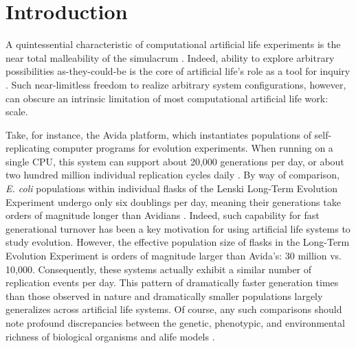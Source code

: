 \section{Introduction}

A quintessential characteristic of computational artificial life experiments is the near total malleability of the simulacrum \citep{pattee1989simulations}.
Indeed, ability to explore arbitrary possibilities as-they-could-be is the core of artificial life's role as a tool for inquiry \citep{langton1997artificial}.
Such near-limitless freedom to realize arbitrary system configurations, however, can obscure an intrinsic limitation of most computational artificial life work: scale.

Take, for instance, the Avida platform, which instantiates populations of self-replicating computer programs for evolution experiments.
When running on a single CPU, this system can support about 20,000 generations per day, or about two hundred million individual replication cycles daily \citep{ofria2009artificial}.
By way of comparison, \textit{E. coli} populations within individual flasks of the Lenski Long-Term Evolution Experiment undergo only six doublings per day, meaning their generations take orders of magnitude longer than Avidians \citep{good2017dynamics}.
Indeed, such capability for fast generational turnover has been a key motivation for using artificial life systems to study evolution.
However, the effective population size of flasks in the Long-Term Evolution Experiment is orders of magnitude larger than Avida's: 30 million vs. 10,000.
Consequently, these systems actually exhibit a similar number of replication events per day.
This pattern of dramatically faster generation times than those observed in nature and dramatically smaller populations largely generalizes across artificial life systems.
Of course, any such comparisons should note profound discrepancies between the genetic, phenotypic, and environmental richness of biological organisms and alife models \citep{PREPRINT}.

